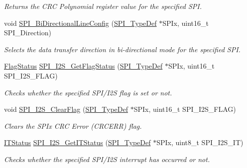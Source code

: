 \begin{DoxyCompactItemize}
\begin{DoxyCompactList}\small\item\em Returns the C\+RC Polynomial register value for the specified S\+PI. \end{DoxyCompactList}\item 
void \mbox{\hyperlink{group___s_p_i___private___functions_ga166171c421fc51da7714723524d41b45}{S\+P\+I\+\_\+\+Bi\+Directional\+Line\+Config}} (\mbox{\hyperlink{struct_s_p_i___type_def}{S\+P\+I\+\_\+\+Type\+Def}} $\ast$S\+P\+Ix, uint16\+\_\+t S\+P\+I\+\_\+\+Direction)
\begin{DoxyCompactList}\small\item\em Selects the data transfer direction in bi-\/directional mode for the specified S\+PI. \end{DoxyCompactList}\item 
\mbox{\hyperlink{group___exported__types_ga89136caac2e14c55151f527ac02daaff}{Flag\+Status}} \mbox{\hyperlink{group___s_p_i___private___functions_ga1bd785d129e09c5734a876c8f2767204}{S\+P\+I\+\_\+\+I2\+S\+\_\+\+Get\+Flag\+Status}} (\mbox{\hyperlink{struct_s_p_i___type_def}{S\+P\+I\+\_\+\+Type\+Def}} $\ast$S\+P\+Ix, uint16\+\_\+t S\+P\+I\+\_\+\+I2\+S\+\_\+\+F\+L\+AG)
\begin{DoxyCompactList}\small\item\em Checks whether the specified S\+P\+I/\+I2S flag is set or not. \end{DoxyCompactList}\item 
void \mbox{\hyperlink{group___s_p_i___private___functions_ga3aabd9e2437e213056c0ed9bdfa1a724}{S\+P\+I\+\_\+\+I2\+S\+\_\+\+Clear\+Flag}} (\mbox{\hyperlink{struct_s_p_i___type_def}{S\+P\+I\+\_\+\+Type\+Def}} $\ast$S\+P\+Ix, uint16\+\_\+t S\+P\+I\+\_\+\+I2\+S\+\_\+\+F\+L\+AG)
\begin{DoxyCompactList}\small\item\em Clears the S\+P\+Ix C\+RC Error (C\+R\+C\+E\+RR) flag. \end{DoxyCompactList}\item 
\mbox{\hyperlink{group___exported__types_gaacbd7ed539db0aacd973a0f6eca34074}{I\+T\+Status}} \mbox{\hyperlink{group___s_p_i___private___functions_ga72decbc1cd79f8fad92a2204beca6bc5}{S\+P\+I\+\_\+\+I2\+S\+\_\+\+Get\+I\+T\+Status}} (\mbox{\hyperlink{struct_s_p_i___type_def}{S\+P\+I\+\_\+\+Type\+Def}} $\ast$S\+P\+Ix, uint8\+\_\+t S\+P\+I\+\_\+\+I2\+S\+\_\+\+IT)
\begin{DoxyCompactList}\small\item\em Checks whether the specified S\+P\+I/\+I2S interrupt has occurred or not. \end{DoxyCompactList}\item 

\end{DoxyCompactItemize}
